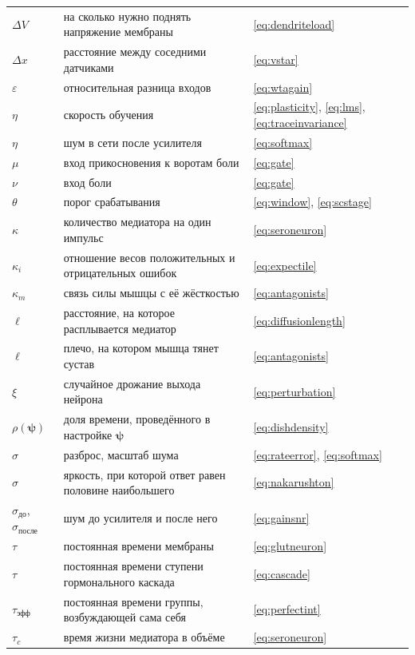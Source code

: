 \begin{center}
\begin{longtable}{>{\raggedright}p{2.0cm}>{\raggedright}p{9.6cm}>{\raggedright\arraybackslash}p{2.4cm}}
$\Delta V$ & на сколько нужно поднять напряжение мембраны & \eqref{eq:dendriteload} \\
$\Delta x$ & расстояние между соседними датчиками & \eqref{eq:vstar} \\
$\varepsilon$ & относительная разница входов & \eqref{eq:wtagain} \\
$\eta$ & скорость обучения & \eqref{eq:plasticity}, \eqref{eq:lms}, \eqref{eq:traceinvariance} \\
$\eta$ & шум в сети после усилителя & \eqref{eq:softmax} \\
$\mu$ & вход прикосновения к воротам боли & \eqref{eq:gate} \\
$\nu$ & вход боли & \eqref{eq:gate} \\
$\theta$ & порог срабатывания & \eqref{eq:window}, \eqref{eq:scstage} \\
$\kappa$ & количество медиатора на один импульс & \eqref{eq:seroneuron} \\
$\kappa_i$ & отношение весов положительных и отрицательных ошибок & \eqref{eq:expectile} \\
$\kappa_m$ & связь силы мышцы с её жёсткостью & \eqref{eq:antagonists} \\
$\ell$ & расстояние, на которое расплывается медиатор & \eqref{eq:diffusionlength} \\
$\ell$ & плечо, на котором мышца тянет сустав & \eqref{eq:antagonists} \\
$\xi$ & случайное дрожание выхода нейрона & \eqref{eq:perturbation} \\
$\rho(\boldsymbol\psi)$ & доля времени, проведённого в настройке $\boldsymbol\psi$ & \eqref{eq:dishdensity} \\
$\sigma$ & разброс, масштаб шума & \eqref{eq:rateerror}, \eqref{eq:softmax} \\
$\sigma$ & яркость, при которой ответ равен половине наибольшего & \eqref{eq:nakarushton} \\
$\sigma_{\text{до}}$, $\sigma_{\text{после}}$ & шум до усилителя и после него & \eqref{eq:gainsnr} \\
$\tau$ & постоянная времени мембраны & \eqref{eq:glutneuron} \\
$\tau$ & постоянная времени ступени гормонального каскада & \eqref{eq:cascade} \\
$\tau_{\text{эфф}}$ & постоянная времени группы, возбуждающей сама себя & \eqref{eq:perfectint} \\
$\tau_c$ & время жизни медиатора в объёме & \eqref{eq:seroneuron} \\

\end{longtable}
\end{center}
